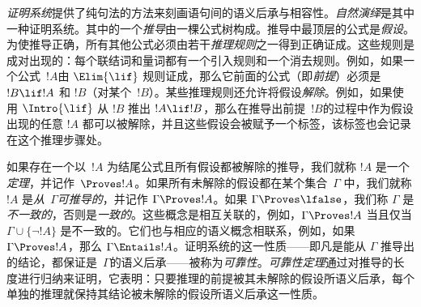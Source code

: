 \emph{证明系统}提供了纯句法的方法来刻画语句间的语义后承与相容性。\emph{自然演绎}是其中一种证明系统。其中的一个\emph{推导}由一棵公式树构成。推导中最顶层的公式是\emph{假设}。为使推导正确，所有其他公式必须由若干\emph{推理规则}之一得到正确证成。这些规则是成对出现的：每个联结词和量词都有一个引入规则和一个消去规则。例如，如果一个公式~$!A$由 $\Elim{\lif}$ 规则证成，那么它前面的公式（即\emph{前提}）必须是 $!B \lif !A$ 和 $!B$（对某个~$!B$）。某些推理规则还允许将假设\emph{解除}。例如，如果使用 $\Intro{\lif}$ 从 $!B$ 推出 $!A \lif !B$，那么在推导出前提~$!B$的过程中作为假设出现的任意 $!A$ 都可以被解除，并且这些假设会被赋予一个标签，该标签也会记录在这个推理步骤处。

如果存在一个以~$!A$ 为结尾公式且所有假设都被解除的推导，我们就称 $!A$ 是一个\emph{定理}，并记作~$\Proves !A$。如果所有未解除的假设都在某个集合~$\Gamma$ 中，我们就称 $!A$ 是\emph{从~$\Gamma$可推导的}，并记作 $\Gamma \Proves !A$。如果 $\Gamma \Proves \lfalse$，我们称 $\Gamma$ 是\emph{不一致的}，否则是\emph{一致的}。这些概念是相互关联的，例如，$\Gamma \Proves !A$ 当且仅当 $\Gamma \cup \{\lnot !A\}$ 是不一致的。它们也与相应的语义概念相联系，例如，如果 $\Gamma \Proves !A$，那么 $\Gamma \Entails !A$。证明系统的这一性质——即凡是能从 $\Gamma$ 推导出的结论，都保证是~$\Gamma$的语义后承——被称为\emph{可靠性}。\emph{可靠性定理}通过对推导的长度进行归纳来证明，它表明：只要推理的前提被其未解除的假设所语义后承，每个单独的推理就保持其结论被未解除的假设所语义后承这一性质。